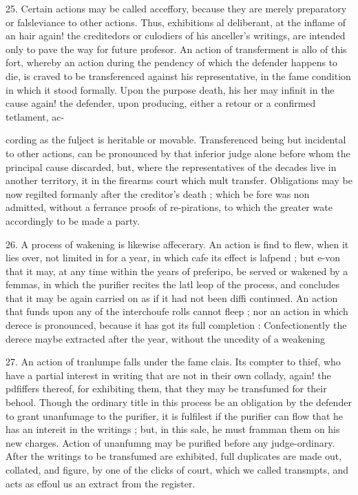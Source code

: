 \documentclass{article}
\begin{document}
25. Certain actions may be called acceffory, because they are merely preparatory or falsleviance to other actions. Thus, exhibitions al deliberant, at the inflame of an hair again! the creditedors or culodiers of his anceller's writings, are intended only to pave the way for future profesor. An action of transferment is allo of this fort, whereby an action during the pendency of which the defender happens to die, is craved to be transferenced against his representative, in the fame condition in which it stood formally. Upon the purpose death, his her may infinit in the cause again! the defender, upon producing, either a retour or a confirmed tetlament, ac-

cording as the fulject is heritable or movable. Transferenced being but incidental to other actions, can be pronounced by that inferior judge alone before whom the principal cause discarded, but, where the representatives of the decades live in another territory, it in the firearms court which mult transfer. Obligations may be now regilted formanly after the creditor's death ; which be fore was non admitted, without a ferrance proofs of re-pirations, to which the greater wate accordingly to be made a party.

26. A process of wakening is likewise affecerary. An action is find to flew, when it lies over, not limited in for a year, in which cafe its effect is lafpend ; but e-von that it may, at any time within the years of preferipo, be served or wakened by a femmas, in which the purifier recites the latl leop of the process, and concludes that it may be again carried on as if it had not been diffi continued. An action that funds upon any of the interchoufe rolls cannot fleep ; nor an action in which derece is pronounced, because it has got its full completion : Confectionently the derece maybe extracted after the year, without the uncedity of a weakening

27. An action of tranlumpe falls under the fame clais. Its compter to thief, who have a partial interest in writing that are not in their own collady, again! the pdfiffers thereof, for exhibiting them, that they may be transfumed for their behool. Though the ordinary title in this process be an obligation by the defender to grant unanfumage to the purifier, it is fulfilest if the purifier can flow that he has an intereit in the writings ; but, in this sale, he must framman them on his new charges. Action of unanfumng may be purified before any judge-ordinary. After the writings to be transfumed are exhibited, full duplicates are made out, collated, and figure, by one of the clicks of court, which we called transmpts, and acts as effoul us an extract from the register.
\end{document}

